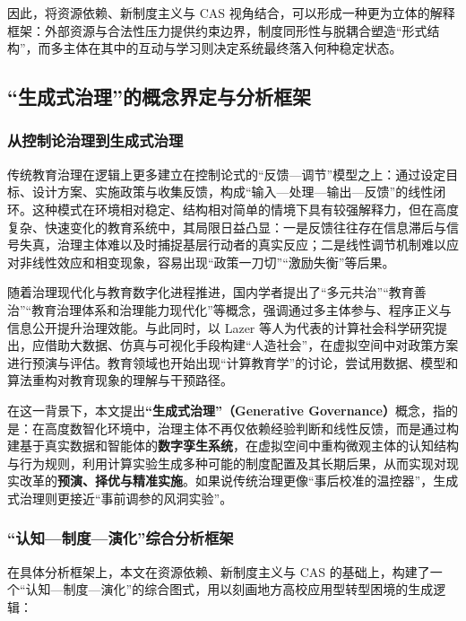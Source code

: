 \documentclass[UTF8, zihao=-4, fontset=mac]{ctexart}
\begin{document}
因此，将资源依赖、新制度主义与 CAS 视角结合，可以形成一种更为立体的解释框架：外部资源与合法性压力提供约束边界，制度同形性与脱耦合塑造“形式结构”，而多主体在其中的互动与学习则决定系统最终落入何种稳定状态。

\subsection{“生成式治理”的概念界定与分析框架}

\subsubsection{从控制论治理到生成式治理}

传统教育治理在逻辑上更多建立在控制论式的“反馈—调节”模型之上：通过设定目标、设计方案、实施政策与收集反馈，构成“输入—处理—输出—反馈”的线性闭环\cite{wiener1948cybernetics}。这种模式在环境相对稳定、结构相对简单的情境下具有较强解释力，但在高度复杂、快速变化的教育系统中，其局限日益凸显：一是反馈往往存在信息滞后与信号失真，治理主体难以及时捕捉基层行动者的真实反应；二是线性调节机制难以应对非线性效应和相变现象，容易出现“政策一刀切”“激励失衡”等后果。

随着治理现代化与教育数字化进程推进，国内学者提出了“多元共治”“教育善治”“教育治理体系和治理能力现代化”等概念，强调通过多主体参与、程序正义与信息公开提升治理效能\cite{shi2020governance, chu2016governance}。与此同时，以 Lazer 等人为代表的计算社会科学研究提出，应借助大数据、仿真与可视化手段构建“人造社会”，在虚拟空间中对政策方案进行预演与评估\cite{lazer2009life, epstein2006generative}。教育领域也开始出现“计算教育学”的讨论，尝试用数据、模型和算法重构对教育现象的理解与干预路径\cite{zhang2023computational}。

在这一背景下，本文提出\textbf{“生成式治理”（Generative Governance）}概念，指的是：在高度数智化环境中，治理主体不再仅依赖经验判断和线性反馈，而是通过构建基于真实数据和智能体的\textbf{数字孪生系统}，在虚拟空间中重构微观主体的认知结构与行为规则，利用计算实验生成多种可能的制度配置及其长期后果，从而实现对现实改革的\textbf{预演、择优与精准实施}。如果说传统治理更像“事后校准的温控器”，生成式治理则更接近“事前调参的风洞实验”。

\subsubsection{“认知—制度—演化”综合分析框架}

在具体分析框架上，本文在资源依赖、新制度主义与 CAS 的基础上，构建了一个“认知—制度—演化”的综合图式，用以刻画地方高校应用型转型困境的生成逻辑：
\end{document}
